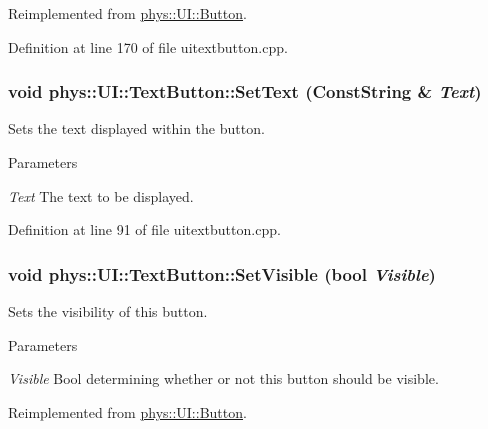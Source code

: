 Reimplemented from \hyperlink{classphys_1_1UI_1_1Button_a06e6526a15b3f8bb6e63c70ac7b02134}{phys::UI::Button}.



Definition at line 170 of file uitextbutton.cpp.

\hypertarget{classphys_1_1UI_1_1TextButton_ae66f149489c4215963dc5b853c838c50}{
\subsubsection[{SetText}]{\setlength{\rightskip}{0pt plus 5cm}void phys::UI::TextButton::SetText ({\bf ConstString} \& {\em Text})}}
\label{df/d03/classphys_1_1UI_1_1TextButton_ae66f149489c4215963dc5b853c838c50}


Sets the text displayed within the button. 


\begin{DoxyParams}{Parameters}
\item[{\em Text}]The text to be displayed. \end{DoxyParams}


Definition at line 91 of file uitextbutton.cpp.

\hypertarget{classphys_1_1UI_1_1TextButton_a07e030ef92f314b1eff663cbc1712d42}{
\subsubsection[{SetVisible}]{\setlength{\rightskip}{0pt plus 5cm}void phys::UI::TextButton::SetVisible (bool {\em Visible})}}
\label{df/d03/classphys_1_1UI_1_1TextButton_a07e030ef92f314b1eff663cbc1712d42}


Sets the visibility of this button. 


\begin{DoxyParams}{Parameters}
\item[{\em Visible}]Bool determining whether or not this button should be visible. \end{DoxyParams}


Reimplemented from \hyperlink{classphys_1_1UI_1_1Button_a293a0a5296778fb3d638c31c5d9d4c75}{phys::UI::Button}.



